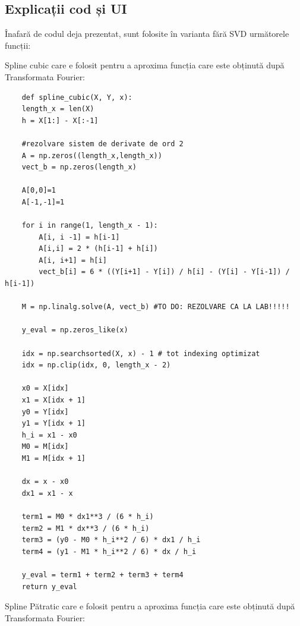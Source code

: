 \documentclass[12pt]{article}
\begin{document}
\subsection{Explicații cod și UI}

Înafară de codul deja prezentat, sunt folosite în varianta fără SVD următorele funcții:

Spline cubic care e folosit pentru a aproxima funcția care este obținută după Transformata Fourier:

\begin{lstlisting}
    def spline_cubic(X, Y, x):
    length_x = len(X)
    h = X[1:] - X[:-1] 

    #rezolvare sistem de derivate de ord 2
    A = np.zeros((length_x,length_x))
    vect_b = np.zeros(length_x)

    A[0,0]=1
    A[-1,-1]=1

    for i in range(1, length_x - 1):
        A[i, i -1] = h[i-1]
        A[i,i] = 2 * (h[i-1] + h[i])
        A[i, i+1] = h[i]
        vect_b[i] = 6 * ((Y[i+1] - Y[i]) / h[i] - (Y[i] - Y[i-1]) / h[i-1])
    
    M = np.linalg.solve(A, vect_b) #TO DO: REZOLVARE CA LA LAB!!!!!

    y_eval = np.zeros_like(x)

    idx = np.searchsorted(X, x) - 1 # tot indexing optimizat
    idx = np.clip(idx, 0, length_x - 2)

    x0 = X[idx]
    x1 = X[idx + 1]
    y0 = Y[idx]
    y1 = Y[idx + 1]
    h_i = x1 - x0
    M0 = M[idx]
    M1 = M[idx + 1]

    dx = x - x0
    dx1 = x1 - x

    term1 = M0 * dx1**3 / (6 * h_i)
    term2 = M1 * dx**3 / (6 * h_i)
    term3 = (y0 - M0 * h_i**2 / 6) * dx1 / h_i
    term4 = (y1 - M1 * h_i**2 / 6) * dx / h_i

    y_eval = term1 + term2 + term3 + term4
    return y_eval
\end{lstlisting}

Spline Pătratic care e folosit pentru a aproxima funcția care este obținută după Transformata Fourier:
\end{document}
